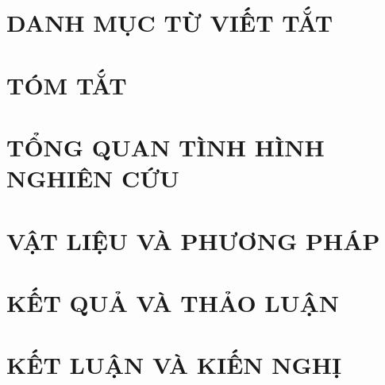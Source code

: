 \documentclass[a4paper]{article}
\begin{document}
\pagebreak

\section*{DANH MỤC TỪ VIẾT TẮT}


\pagebreak

\setcounter{page}{1}

\section*{TÓM TẮT}\label{sec_tomtat}


\pagebreak

\section{TỔNG QUAN TÌNH HÌNH NGHIÊN CỨU}


\pagebreak

\section{VẬT LIỆU VÀ PHƯƠNG PHÁP}


\pagebreak

\section{KẾT QUẢ VÀ THẢO LUẬN}


\pagebreak

\section*{KẾT LUẬN VÀ KIẾN NGHỊ}


\pagebreak

\renewcommand*\refname{\centering\fontsize{13pt}{15pt}\selectfont{TÀI LIỆU THAM KHẢO}}
\label{Tai_Lieu_Tham_Khao}



\end{document}
